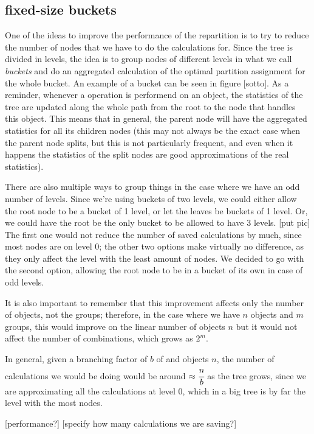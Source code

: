 \subsection{fixed-size buckets}\label{sec:fixed-size buckets}
One of the ideas to improve the performance of the repartition is to try to reduce the number of nodes that we have to do the calculations for. Since the tree is divided in levels, the idea is to group nodes of different levels in what we call \emph{buckets} and do an aggregated calculation of the optimal partition assignment for the whole bucket. An example of a bucket can be seen in figure [sotto]. As a reminder, whenever a operation is performend on an object, the statistics of the tree are updated along the whole path from the root to the node that handles this object. This means that in general, the parent node will have the aggregated statistics for all its children nodes (this may not always be the exact case when the parent node splits, but this is not particularly frequent, and even when it happens the statistics of the split nodes are good approximations of the real statistics).

There are also multiple ways to group things in the case where we have an odd number of levels. Since we're using buckets of two levels, we could either allow the root node to be a bucket of 1 level, or let the leaves be buckets of 1 level. Or, we could have the root be the only bucket to be allowed to have 3 levels. [put pic] The first one would not reduce the number of saved calculations by much, since most nodes are on level 0; the other two options make virtually no difference, as they only affect the level with the least amount of nodes. We decided to go with the second option, allowing the root node to be in a bucket of its own in case of odd levels.

It is also important to remember that this improvement affects only the number of objects, not the groups; therefore, in the case where we have $n$ objects and $m$ groups, this would improve on the linear number of objects $n$ but it would not affect the number of combinations, which grows as $2^m$.

In general, given a branching factor of $b$ of and objects $n$, the number of calculations we would be doing would be around $\approx\cfrac{n}{b}$ as the tree grows, since we are approximating all the calculations at level 0, which in a big tree is by far the level with the most nodes.

[performance?]
[specify how many calculations we are saving?]

